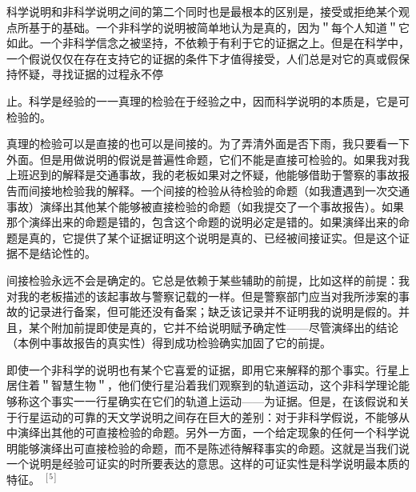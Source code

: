 科学说明和非科学说明之间的第二个同时也是最根本的区别是，接受或拒绝某个观点所基于的基础。一个非科学的说明被简单地认为是真的，因为＂每个人知道＂它如此。一个非科学信念之被坚持，不依赖于有利于它的证据之上。但是在科学中，一个假说仅仅在存在支持它的证据的条件下才值得接受，人们总是对它的真或假保持怀疑，寻找证据的过程永不停

止。科学是经验的一一真理的检验在于经验之中，因而科学说明的本质是，它是可检验的。

真理的检验可以是直接的也可以是间接的。为了弄清外面是否下雨，我只要看一下外面。但是用做说明的假说是普遍性命题，它们不能是直接可检验的。如果我对我上班迟到的解释是交通事故，我的老板如果对之怀疑，他能够借助于警察的事故报告而间接地检验我的解释。一个间接的检验从待检验的命题（如我遭遇到一次交通事故）演绎出其他某个能够被直接检验的命题（如我提交了一个事故报告）。如果那个演绎出来的命题是错的，包含这个命题的说明必定是错的。如果演绎出来的命题是真的，它提供了某个证据证明这个说明是真的、已经被间接证实。但是这个证据不是结论性的。

间接检验永远不会是确定的。它总是依赖于某些辅助的前提，比如这样的前提：我对我的老板描述的该起事故与警察记载的一样。但是警察部门应当对我所涉案的事故的记录进行备案，但可能还没有备案；缺乏该记录并不证明我的说明是假的。并且，某个附加前提即使是真的，它并不给说明赋予确定性——尽管演绎出的结论（本例中事故报告的真实性）得到成功检验确实加固了它的前提。

即使一个非科学的说明也有某个它喜爱的证据，即用它来解释的那个事实。行星上居住着＂智慧生物＂，他们使行星沿着我们观察到的轨道运动，这个非科学理论能够称这个事实一一行星确实在它们的轨道上运动——为证据。但是，在该假说和关于行星运动的可靠的天文学说明之间存在巨大的差别：对于非科学假说，不能够从中演绎出其他的可直接检验的命题。另外一方面，一个给定现象的任何一个科学说明能够演绎出可直接检验的命题，而不是陈述待解释事实的命题。这就是当我们说一个说明是经验可证实的时所要表达的意思。这样的可证实性是科学说明最本质的特征。 ${ }^{[5]}$ 

